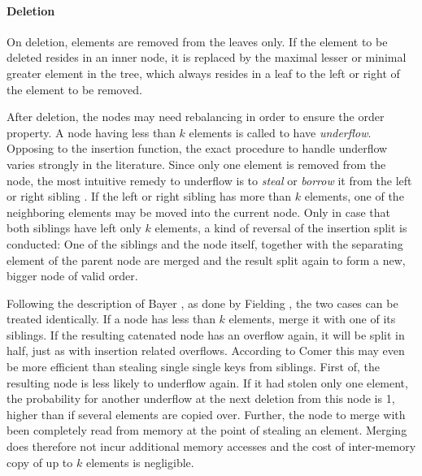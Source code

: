 \paragraph{Deletion}\label{par:intro-del}
On deletion, elements are removed from the leaves only.
If the element to be deleted resides in an inner node,
it is replaced by the maximal lesser or minimal greater
element in the tree, which always resides in a leaf
to the left or right of the element to be removed.

After deletion, the nodes may need rebalancing in order
to ensure the order property.
A node having less than $k$ elements is called to have \textit{underflow}.
Opposing to the insertion function,
the exact procedure to handle underflow varies strongly in the literature.
Since only one element is removed from the node,
the most intuitive remedy to underflow is to \textit{steal} or \textit{borrow} it
from the left or right sibling \parencite{DBLP:books/daglib/0023376}.
If the left or right sibling has more than $k$ elements,
one of the neighboring elements may be moved into the current node.
Only in case that both siblings have left only $k$ elements,
a kind of reversal of the insertion split is conducted:
One of the siblings and the node itself, together with the separating
element of the parent node are merged and the result split again to form
a new, bigger node of valid order.

Following the description of Bayer \parencite{DBLP:journals/acta/BayerM72},
as done by Fielding \parencite{Fielding80},
the two cases can be treated identically.
If a node has less than $k$ elements,
merge it with one of its siblings.
If the resulting catenated node has an overflow again,
it will be split in half, just as with insertion related overflows.
According to Comer \parencite{DBLP:journals/csur/Comer79} this may even be
more efficient than stealing single single keys from siblings.
First of, the resulting node is less likely to underflow again.
If it had stolen only one element, the probability for another underflow at the next
deletion from this node is 1, higher than if several elements are copied over.
Further, the node to merge with been completely read from memory at the point
of stealing an element.
Merging does therefore not incur additional memory accesses and
the cost of inter-memory copy of up to $k$ elements is negligible.


